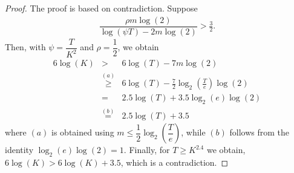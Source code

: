 \begin{proof}
The proof is based on contradiction. Suppose
\begin{eqnarray*}
\dfrac{\rho m \log(2)}{\log(\psi T) - 2m\log( 2)} > \frac{3}{2}.
\end{eqnarray*}
Then, with $\psi=\dfrac{T}{ K^2}$ and $\rho=\dfrac{1}{2}$, we obtain
\begin{eqnarray*}
6\log(K) 
&>& 6\log(T) - 7m\log(2) \\
&\overset{(a)}{\ge}& 6\log(T) - \frac{7}{2} \log_2\left(\frac{T}{e}\right) \log(2) \\
&=& 2.5\log(T) + 3.5 \log_2(e)\log(2)  \\
&\overset{(b)}{=}& 2.5\log(T) +3.5
\end{eqnarray*}
where $(a)$ is obtained using $m\leq \dfrac{1}{2} \log_2\left(\dfrac{T}{e}\right)$, while $(b)$ follows from the identity $\log_2(e)\log(2) =1$. Finally, for $T\ge K^{2.4}$ we obtain, $6\log(K)>6\log(K)+3.5$, which is a contradiction.

\end{proof}

